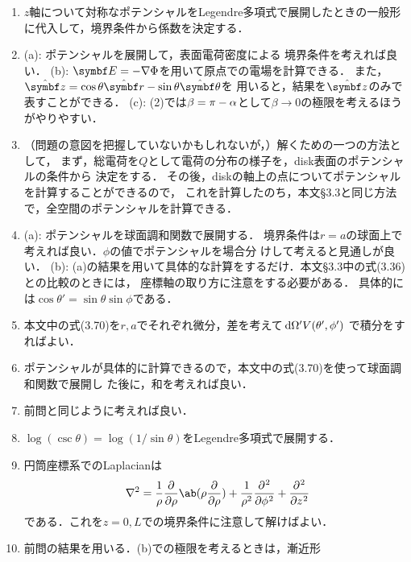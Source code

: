 \begin{enumerate}[label={\large 3.\arabic*}]
  \item $z$軸について対称なポテンシャルをLegendre多項式で展開したときの一般形
    に代入して，境界条件から係数を決定する．
  \item 
    (a): ポテンシャルを展開して，表面電荷密度による
        境界条件を考えれば良い．
    (b):  $\bs{E} = -\gr \Phi$を用いて原点での電場を計算できる．
        また，$\hat{\bs{z}} = \cos\theta \hat{\bs{r}} - \sin\theta \hat{\bs{\theta}}$を
        用いると，結果を$\hat{\bs{z}}$のみで表すことができる．
    (c): (2)では$\beta = \pi - \alpha$として$\beta \to 0$の極限を考えるほうがやりやすい．
  \item 
    （問題の意図を把握していないかもしれないが，）解くための一つの方法として，
    まず，総電荷を$Q$として電荷の分布の様子を，disk表面のポテンシャルの条件から
    決定をする．
    その後，diskの軸上の点についてポテンシャルを計算することができるので，
    これを計算したのち，本文\S 3.3と同じ方法で，全空間のポテンシャルを計算できる．
  \item 
    (a): ポテンシャルを球面調和関数で展開する．
        境界条件は$r=a$の球面上で考えれば良い．$\phi$の値でポテンシャルを場合分
        けして考えると見通しが良い．
    (b): (a)の結果を用いて具体的な計算をするだけ．本文\S3.3中の式(3.36)との比較のときには，
        座標軸の取り方に注意をする必要がある．
        具体的には$\cos\theta' = \sin\theta \sin\phi$である．
  \item 本文中の式(3.70)を$r,a$でそれぞれ微分，差を考えて$\dl{\Omega'} V(\theta',\phi')$
    で積分をすればよい．
  \item ポテンシャルが具体的に計算できるので，本文中の式(3.70)を使って球面調和関数で展開し
    た後に，和を考えれば良い．
  \item 前問と同じように考えれば良い．
  \item $\log(\csc\theta) = \log(1/\sin\theta)$をLegendre多項式で展開する．
  \item 円筒座標系でのLaplacianは
    \begin{gather}%
      \gr^2 = \frac{1}{\rho}\diffp**{\rho}{\ab(\rho\diffp{}{\rho})} + \frac{1}{\rho^2} \diffp[2]{}{\phi} + \diffp[2]{}{z}
    \end{gather}%
    である．これを$z=0,L$での境界条件に注意して解けばよい．
  \item 前問の結果を用いる．(b)での極限を考えるときは，漸近形

\end{enumerate}

